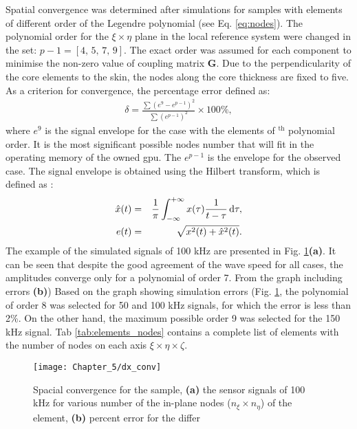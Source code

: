 Spatial convergence was determined after simulations for samples with elements of different order of the Legendre polynomial (see Eq. \ref{eq:nodes}).
The polynomial order for the \(\xi\times \eta\) plane in the local reference system were changed in the set: \(p-1=[4,\,5,\,7,\,9]\).
The exact order was assumed for each component to minimise the non-zero value of coupling matrix \(\textbf{G}\).
Due to the perpendicularity of the core elements to the skin, the nodes along the core thickness are fixed to five.
As a criterion for convergence, the percentage error defined as:
\begin{eqnarray}
	\delta = \frac{\sum{\left(e^{9}-e^{p-1}\right)^2}}{\sum{\left(e^{p-1}\right)^2}} \times 100\%,
	\label{eq:perc_err_conv}
\end{eqnarray}
where \(e^{9}\) is the signal envelope for the case with the elements of \(^{\mathrm{th}}\) polynomial order.
It is the most significant possible nodes number that will fit in the operating memory of the owned \ac{gpu}.
The \(e^{p-1}\) is the envelope for the observed case.
The signal envelope is obtained using
the Hilbert transform, which is defined as \cite{staszewski2004health}:
\begin{eqnarray}
	\label{eq:hilbert}
	\hat{x}(t) &=& \frac{1}{\pi}\int_{-\infty}^{+\infty}x(\tau)\frac{1}{t-\tau}\mathop{}\!\mathrm{d}\tau,\\
	\label{eq:envelope}
	e(t) &=& \sqrt{x^2(t)+\hat{x}^2(t)}.
\end{eqnarray}
%
%
The example of the simulated signals of 100 \unit{\kHz} are presented in Fig. \ref{fig:dx_conv}\textbf{(a)}.
It can be seen that despite the good agreement of the wave speed for all cases, the amplitudes converge only for a polynomial of order 7. 
From the graph including errors \textbf{(b)}) 
Based on the graph showing simulation errors (Fig. \ref{fig:dx_conv}, the polynomial of order 8 was selected for 50 and 100 \unit{\kHz} signals, for which the error is less than 2\%.
On the other hand, the maximum possible order 9 was selected for the 150 \unit{\kHz} signal.
Tab \ref{tab:elements_nodes} contains a complete list of elements with the number of nodes on each axis \(\xi\times \eta \times \zeta\).
\begin{figure}[H]
\begin{center}
	\texttt{[image: Chapter\_5/dx\_conv]}
\end{center}
\caption{Spacial convergence for the sample, \textbf{(a)} the sensor signals of 100 \unit{\kHz} for various number of the in-plane nodes (\(n_{\xi} \times n_{\eta}\)) of the element, \textbf{(b)} percent error for the differ}
\label{fig:dx_conv}
\end{figure}
